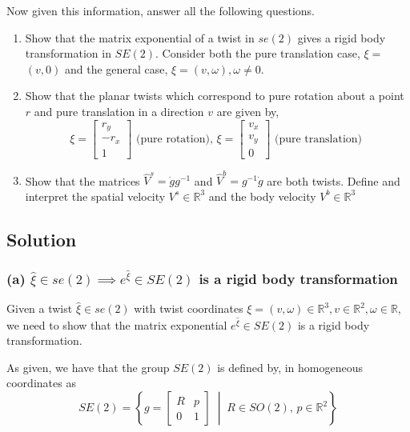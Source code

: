 Now given this information, answer all the following questions.
\begin{enumerate}[label= (\alph*)]
    \item Show that the matrix exponential of a twist in \( s e(2) \) gives a rigid body transformation in \( S E(2) \).
          Consider both the pure translation case, \( \xi= \) \( (v, 0) \) and the general case, \( \xi=(v, \omega), \omega \neq 0 \).
    \item Show that the planar twists which correspond to pure rotation about a point \( r \) and pure translation in a direction \( v \) are given by,
          \[
              \xi=\left[\begin{array}{c}
                      r_{y}  \\
                      -r_{x} \\
                      1
                  \end{array}\right] \text { (pure rotation), } \xi=\left[\begin{array}{c}
                      v_{x} \\
                      v_{y} \\
                      0
                  \end{array}\right] \text { (pure translation) }
          \]
    \item Show that the matrices \( \hat{V}^{s}=\dot{g} g^{-1} \) and \( \hat{V}^{b}=g^{-1} \dot{g} \) are both twists.
          Define and interpret the spatial velocity \( V^{s} \in \mathbb{R}^{3} \) and the body velocity \( V^{b} \in \mathbb{R}^{3} \)
\end{enumerate}

\clearpage
\subsection*{Solution}

\subsubsection*{(a) \( \hat{\xi} \in se(2) \implies e^{\hat{\xi}} \in SE(2) \) is a rigid body transformation}

Given a twist \( \hat{\xi} \in se(2) \) with twist coordinates \( \xi = (v, \omega) \in \mathbb{R}^3, v \in \mathbb{R}^2, \omega \in \mathbb{R} \), we need to show that the matrix exponential \( e^{\hat{\xi}} \in SE(2) \) is a rigid body transformation.

As given, we have that the group \( SE(2) \) is defined by, in homogeneous coordinates as
\begin{equation}\label{eq:SE2-homogeneous}
    SE(2) = \left \{ g = \begin{bmatrix}
        R & p \\
        0 & 1
    \end{bmatrix} \; \middle| \; R \in SO(2), \, p \in \mathbb{R}^2 \right \}
\end{equation}

